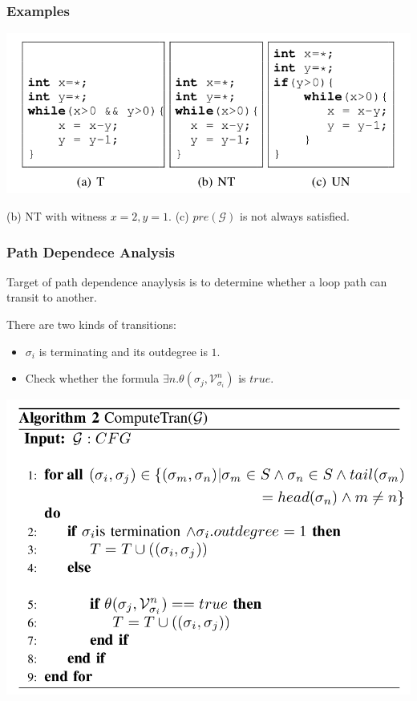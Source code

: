 \documentclass[11pt]{beamer}
\begin{document}
\begin{frame}\frametitle{Examples}
\begin{center}
\includegraphics[scale=0.35]{algo1Exp.png}

(b) NT with witness $x = 2, y = 1$.
(c) $pre(\mathcal{G})$ is not always satisfied.
\end{center}
\end{frame}
\begin{frame}\frametitle{Path Dependece Analysis}
\begin{multicols}{2}
Target of path dependence anaylysis is to determine whether a loop path can transit to another.

There are two kinds of transitions:
\begin{itemize}
\item $\sigma_i$ is terminating and its outdegree is $1$.

\item Check whether the formula $\exists n. \theta(\sigma_j, \mathcal{V}^n_{\sigma_i})$ is $true$.
\end{itemize}

\includegraphics[scale=0.2]{algo2.png}
\end{multicols}
\end{frame}
\end{document}
